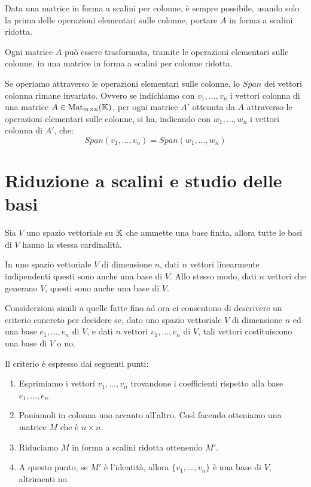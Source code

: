 \begin{proposition}
	Data una matrice in forma a scalini per colonne, è sempre possibile, usando
	solo la prima delle operazioni elementari sulle colonne, portare $A$ in forma
	a scalini ridotta.
\end{proposition}

\begin{corollary}
	Ogni matrice $A$ può essere trasformata, tramite le operazioni elementari
	sulle colonne, in una matrice in forma a scalini per colonne ridotta.
\end{corollary}

\begin{proposition}
	Se operiamo attraverso le operazioni elementari sulle colonne, lo
	$Span$ dei vettori colonna rimane invariato. Ovvero se indichiamo con
	$v_1, \dots, v_n$ i vettori colonna di una matrice
	$A \in \operatorname{Mat}_{m \times n}(\mathbb{K})$, per ogni matrice $A'$ ottenuta da $A$
	attraverso le operazioni elementari sulle colonne, si ha, indicando con
	$w_1, \dots, w_n$ i vettori colonna di $A'$, che:
	\[
		Span(v_1, \dots, v_n) = Span(w_1, \dots, w_n)
	\]
\end{proposition}

\section{Riduzione a scalini e studio delle basi}

\begin{theorem}
	Sia $V$ uno spazio vettoriale su $\mathbb{K}$ che ammette una base
	finita, allora tutte le basi di $V$ hanno la stessa cardinalità.
\end{theorem}

\begin{corollary}
	In uno spazio vettoriale $V$ di dimensione $n$, dati $n$ vettori
	linearmente indipendenti questi sono anche una base di $V$. Allo
	stesso modo, dati $n$ vettori che generano $V$, questi sono anche una
	base di $V$.
\end{corollary}

Considerzioni simili a quelle fatte fino ad ora ci consentono di descrivere
un criterio concreto per decidere se, dato uno spazio vettoriale $V$ di
dimensione $n$ ed una base $e_1, \dots, e_n$ di $V$, e dati $n$ vettori
$v_1, \dots, v_n$ di $V$, tali vettori costituiscono una base di $V$ o no.

Il criterio è espresso dai seguenti punti:
\begin{enumerate}
	\item Esprimiamo i vettori $v_1, \dots, v_n$ trovandone i coefficienti rispetto
	      alla base $e_1, \dots, e_n$.
	\item Poniamoli in colonna uno accanto all'altro. Così facendo otteniamo una
	      matrice $M$ che è $n \times n$.
	\item Riduciamo $M$ in forma a scalini ridotta ottenendo $M'$.
	\item A questo punto, se $M'$ è l'identità, allora $\{v_1, \dots, v_n\}$
	      è una base di $V$, altrimenti no.
\end{enumerate}

